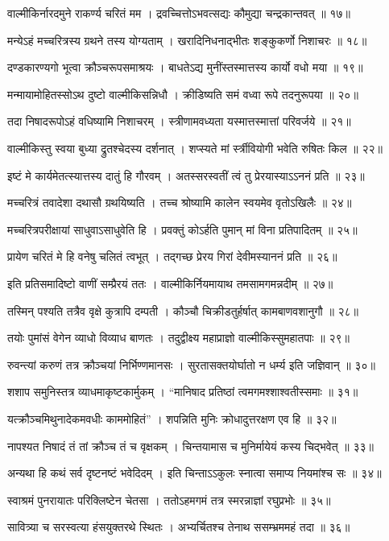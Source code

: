वाल्मीकिर्नारदमुने राकर्ण्य चरितं मम ।
द्रवच्चित्तोऽभवत्सद्यः कौमुद्या चन्द्रकान्तवत् ॥ १७॥

मन्येऽहं मच्चरित्रस्य ग्रथने तस्य योग्यताम् ।
खरादिनिधनाद्भीतः शङ्कुकर्णो निशाचरः ॥ १८॥

दण्डकारण्यगो भूत्वा क्रौञ्चरूपसमाश्रयः ।
बाधतेऽद्य मुनींस्तस्मात्तस्य कार्यो वधो मया ॥ १९॥

मन्मायामोहितस्सोऽथ दुष्टो वाल्मीकिसन्निधौ ।
क्रीडिष्यति समं वध्वा रूपे तदनुरूपया ॥ २०॥

तदा निषादरूपोऽहं वधिष्यामि निशाचरम् ।
स्त्रीणामवध्यता यस्मात्तस्मात्तां परिवर्जये ॥ २१॥

वाल्मीकिस्तु स्वया बुध्या द्रुतश्चेदस्य दर्शनात् ।
शप्स्यते मां र्स्त्रीवियोगी भवेति रुषितः किल ॥ २२॥

इष्टं मे कार्यमेतत्स्यात्तस्य दातुं हि गौरवम् ।
अतस्सरस्वतीं त्वं तु प्रेरयास्याऽऽननं प्रति ॥ २३॥

मच्चरित्रं तवादेशा दथासौ ग्रथयिष्यति ।
तच्च श्रोष्यामि कालेन स्वयमेव वृतोऽखिलैः ॥ २४॥

मच्चरित्रपरीक्षायां साधुवाऽसाधुवेति हि ।
प्रवक्तुं कोऽर्हति पुमान् मां विना प्रतिपादितम् ॥ २५॥

प्रायेण चरितं मे हि वनेषु चलितं त्वभूत् ।
तद्गच्छ प्रेरय गिरां देवीमस्याननं प्रति ॥ २६॥

इति प्रतिसमादिष्टो वाणीं सम्प्रैरयं ततः ।
वाल्मीकिर्नियमायाथ तमसामगमन्नदीम् ॥ २७॥

तस्मिन् पश्यति तत्रैव वृक्षे कुत्रापि दम्पती ।
कौञ्चौ चिक्रीडतुर्हर्षात् कामबाणवशानुगौ ॥ २८॥

तयोः पुमांसं वेगेन व्याधो विव्याध बाणतः ।
तदुद्वीक्ष्य महाप्राज्ञो वाल्मीकिस्सुमहातपाः ॥ २९॥

रुवन्त्यां करुणं तत्र क्रौञ्चयां निर्भिण्णमानसः ।
सुरतासक्तयोर्घातो न धर्म्य इति जज्ञिवान् ॥ ३०॥

शशाप समुनिस्तत्र व्याधमाकृष्टकार्मुकम् ।
``मानिषाद प्रतिष्ठां त्वमगमश्शाश्वतीस्समाः ॥ ३१॥

यत्क्रौञ्चमिथुनादेकमवधीः काममोहितं'' ।
शपन्निति मुनिः क्रोधादुत्तरक्षण एव हि ॥ ३२॥

नापश्यत निषादं तं तां क्रौञ्च तं च वृक्षकम् ।
चिन्तयामास च मुनिर्मायेयं कस्य चिद्भवेत् ॥ ३३॥

अन्यथा हि कथं सर्व दृष्टनष्टं भवेदिदम् ।
इति चिन्ताऽऽकुलः स्नात्वा समाप्य नियमांश्च सः ॥ ३४॥

स्वाश्रमं पुनरायातः परिक्लिष्टेन चेतसा ।
ततोऽहमगमं तत्र स्मरन्नाज्ञां रघुप्रभोः ॥ ३५॥

सावित्र्या च सरस्वत्या हंसयुक्तरथे स्थितः ।
अभ्यर्चितश्च तेनाथ ससम्भ्रममहं तदा ॥ ३६॥

